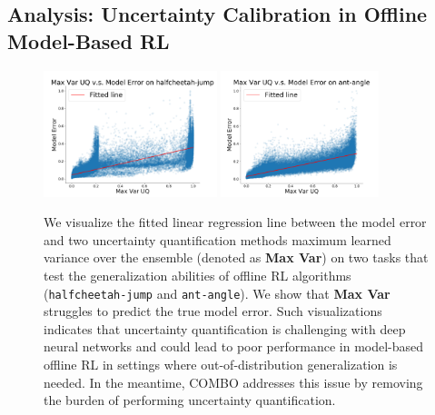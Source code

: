 \vspace{-0.2cm}
\subsection{Analysis: Uncertainty Calibration in Offline Model-Based RL}
\label{sec:uq}
\vspace{-0.2cm}

\begin{figure}[t]
    \vspace{-0.5cm}
        \centering
        \includegraphics[width=0.45\textwidth]{chapters/combo/halfcheetah_jump_linear_regression_lip_ens_ood.png}
        \includegraphics[width=0.41\textwidth]{chapters/combo/ant_angle_linear_regression_lip_ens_ood.png}
        \vspace{-0.2cm}
        \caption{\footnotesize {We visualize the fitted linear regression line between the model error and two uncertainty quantification methods maximum learned variance over the ensemble (denoted as \textbf{Max Var}) on two tasks that test the generalization abilities of offline RL algorithms (\texttt{halfcheetah-jump} and \texttt{ant-angle}). We show that \textbf{Max Var} struggles to predict the true model error. Such visualizations indicates that uncertainty quantification is challenging with deep neural networks and could lead to poor performance in model-based offline RL in settings where out-of-distribution generalization is needed. In the meantime, COMBO addresses this issue by removing the burden of performing uncertainty quantification.}}
        \label{fig:uq}
        \vspace{-0.4cm}
\end{figure}

